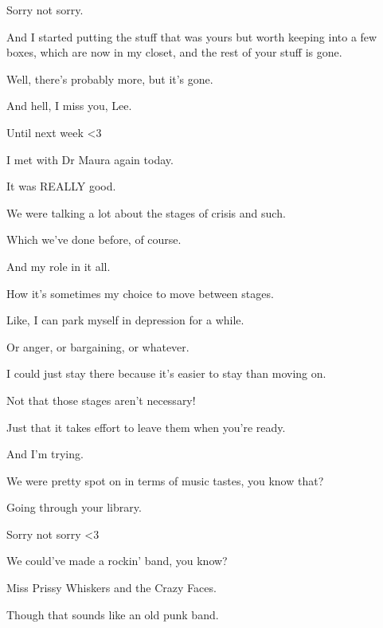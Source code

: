 { Sorry not sorry.

 And I started putting the stuff that was yours but worth keeping into a few boxes, which are now in my closet, and the rest of your stuff is gone.

 Well, there's probably more, but it's gone.

 And hell, I miss you, Lee.

 Until next week \textless{}3

\nopagebreak

 I met with Dr Maura again today.

 It was REALLY good.

 We were talking a lot about the stages of crisis and such.

 Which we've done before, of course.

 And my role in it all.

 How it's sometimes my choice to move between stages.

 Like, I can park myself in depression for a while.

 Or anger, or bargaining, or whatever.

 I could just stay there because it's easier to stay than moving on.

 Not that those stages aren't necessary!

 Just that it takes effort to leave them when you're ready.

 And I'm trying.

 We were pretty spot on in terms of music tastes, you know that?

 Going through your library.

 Sorry not sorry \textless{}3

 We could've made a rockin' band, you know?

 Miss Prissy Whiskers and the Crazy Faces.

 Though that sounds like an old punk band.

}
